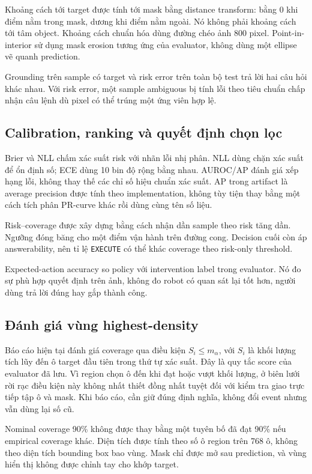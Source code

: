 Khoảng cách tới target được tính tới mask bằng distance
transform: bằng 0 khi điểm nằm trong mask, dương khi
điểm nằm ngoài. Nó không phải khoảng cách tới tâm object.
Khoảng cách chuẩn hóa dùng đường chéo ảnh 800 pixel.
Point-in-interior sử dụng mask erosion tương ứng của
evaluator, không dùng một ellipse vẽ quanh prediction.

Grounding trên sample có target và risk error trên
toàn bộ test trả lời hai câu hỏi khác nhau.
Với risk error, một sample ambiguous bị tính lỗi
theo tiêu chuẩn chấp nhận câu lệnh dù pixel có thể
trúng một ứng viên hợp lệ.

\subsection{Calibration, ranking và quyết định chọn lọc}

Brier và NLL chấm xác suất risk với nhãn lỗi nhị phân.
NLL dùng chặn xác suất để ổn định số; ECE dùng 10 bin
độ rộng bằng nhau. AUROC/AP đánh giá xếp hạng lỗi,
không thay thế các chỉ số hiệu chuẩn xác suất.
AP trong artifact là average precision được tính
theo implementation, không tùy tiện thay bằng một
cách tích phân PR-curve khác rồi dùng cùng tên số liệu.

Risk--coverage được xây dựng bằng cách nhận dần sample
theo risk tăng dần. Ngưỡng đóng băng cho một điểm vận
hành trên đường cong. Decision cuối còn áp
answerability, nên tỉ lệ \texttt{EXECUTE} có thể khác
coverage theo risk-only threshold.

Expected-action accuracy so policy với intervention
label trong evaluator. Nó đo sự phù hợp quyết định
trên ảnh, không đo robot có quan sát lại tốt hơn,
người dùng trả lời đúng hay gắp thành công.

\subsection{Đánh giá vùng highest-density}

Báo cáo hiện tại đánh giá coverage qua điều kiện
$S_i\leq m_\alpha$, với $S_i$ là khối lượng tích lũy
đến ô target đầu tiên trong thứ tự xác suất.
Đây là quy tắc score của evaluator đã lưu.
Vì region chọn ô đến khi đạt hoặc vượt khối lượng,
ở biên lưới rời rạc điều kiện này không nhất thiết
đồng nhất tuyệt đối với kiểm tra giao trực tiếp
tập ô và mask. Khi báo cáo, cần giữ đúng định nghĩa,
không đổi event nhưng vẫn dùng lại số cũ.

Nominal coverage 90\% không được thay bằng một tuyên
bố đã đạt 90\% nếu empirical coverage khác.
Diện tích được tính theo số ô region trên 768 ô,
không theo diện tích bounding box bao vùng.
Mask chỉ được mở sau prediction, và vùng hiển thị
không được chỉnh tay cho khớp target.

